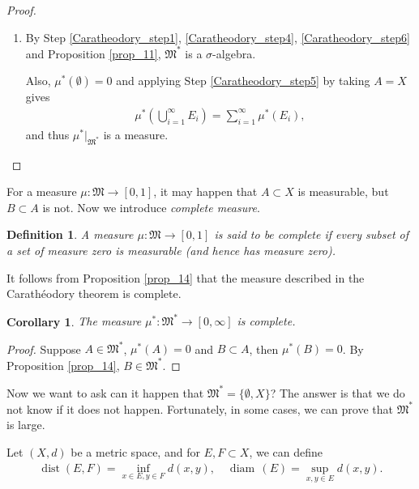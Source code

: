 \documentclass[11pt]{book}
\newtheorem{definition}{Definition}[chapter]
\newtheorem{corollary}{Corollary}[theorem]
\theoremstyle{definition}
\numberwithin{equation}{chapter}
\def\MM{\mathfrak{M}}
\def\diam{{\operatorname{diam}\,}}
\begin{document}
\begin{proof}
\begin{enumerate}[label=(\Roman*)]
    \item By Step \ref{Caratheodory_step1}, \ref{Caratheodory_step4}, \ref{Caratheodory_step6} and Proposition \ref{prop_11}, $\MM^*$ is a $\sigma$-algebra. 
    
    Also, $\mu^*(\emptyset) = 0$ and applying Step \ref{Caratheodory_step5} by taking $A = X$ gives
    \begin{align*}
        \mu^* \left(\bigcup^\infty_{i=1} E_i\right) = \sum^\infty_{i=1} \mu^*(E_i),
    \end{align*}
    and thus $\mu^*|_{\MM^*}$ is a measure.
\end{enumerate}
\end{proof}

\medskip

For a measure $\mu: \MM \to [0,1]$, it may happen that $A \subset X$ is measurable, but $B \subset A$ is not. Now we introduce {\em complete measure}. 

\medskip

\begin{definition}\label{def_19}
A measure $\mu: \MM \to [0,1]$ is said to be complete if every subset of a set of measure zero is measurable (and hence has measure zero).
\end{definition}

\medskip

It follows from Proposition \ref{prop_14} that the measure described in the Carathéodory theorem is complete.

\medskip

\begin{corollary}\label{coro_171}
The measure $\mu^*: \MM^* \to [0,\infty]$ is complete.
\end{corollary}
\begin{proof}
Suppose $A \in \MM^*$, $\mu^*(A) = 0$ and $B \subset A$, then $\mu^*(B) = 0$. By Proposition \ref{prop_14}, $B \in \MM^*$. 
\end{proof}

\medskip

Now we want to ask can it happen that $\MM^* = \{\emptyset, X\}$? The answer is that we do not know if it does not happen. Fortunately, in some cases, we can prove that $\MM^*$ is large.

Let $(X,d)$ be a metric space, and for $E, F \subset X$, we can define
\begin{align*}
    \operatorname{dist}(E,F) = \inf_{x\in E,y\in F} d(x,y),\quad \diam(E) = \sup_{x,y\in E} d(x,y).
\end{align*}
\end{document}
